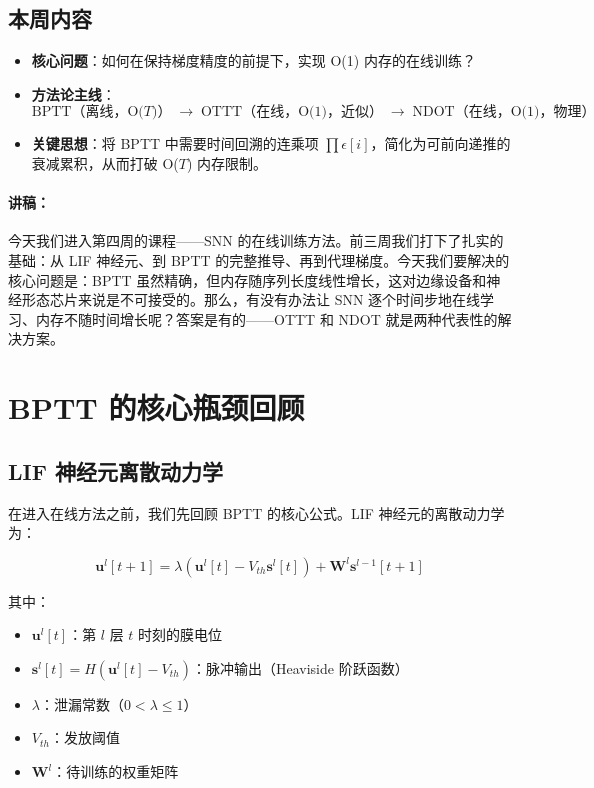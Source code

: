 \documentclass[journal,12pt,onecolumn]{IEEEtran}
\begin{document}
\subsection*{本周内容}

\begin{itemize}
    \item \textbf{核心问题}：如何在保持梯度精度的前提下，实现 O(1) 内存的在线训练？
    \item \textbf{方法论主线}：
    \[
    \text{BPTT（离线，O($T$)）} \;\longrightarrow\; \text{OTTT（在线，O(1)，近似）} \;\longrightarrow\; \text{NDOT（在线，O(1)，物理）}
    \]
    \item \textbf{关键思想}：将 BPTT 中需要时间回溯的连乘项 $\prod \epsilon[i]$，简化为可前向递推的衰减累积，从而打破 O($T$) 内存限制。
\end{itemize}

\paragraph{讲稿：}
今天我们进入第四周的课程——SNN 的在线训练方法。前三周我们打下了扎实的基础：从 LIF 神经元、到 BPTT 的完整推导、再到代理梯度。今天我们要解决的核心问题是：BPTT 虽然精确，但内存随序列长度线性增长，这对边缘设备和神经形态芯片来说是不可接受的。那么，有没有办法让 SNN 逐个时间步地在线学习、内存不随时间增长呢？答案是有的——OTTT 和 NDOT 就是两种代表性的解决方案。

\section{BPTT 的核心瓶颈回顾}

\subsection*{LIF 神经元离散动力学}

在进入在线方法之前，我们先回顾 BPTT 的核心公式。LIF 神经元的离散动力学为：

\begin{equation}
\mathbf{u}^{l}[t+1] = \lambda (\mathbf{u}^{l}[t] - V_{th}\mathbf{s}^{l}[t]) + \mathbf{W}^{l}\mathbf{s}^{l-1}[t+1]
\label{eq.lif}
\end{equation}

其中：
\begin{itemize}
    \item $\mathbf{u}^{l}[t]$：第 $l$ 层 $t$ 时刻的膜电位
    \item $\mathbf{s}^{l}[t] = H(\mathbf{u}^{l}[t] - V_{th})$：脉冲输出（Heaviside 阶跃函数）
    \item $\lambda$：泄漏常数（$0 < \lambda \leq 1$）
    \item $V_{th}$：发放阈值
    \item $\mathbf{W}^{l}$：待训练的权重矩阵
\end{itemize}
\end{document}
